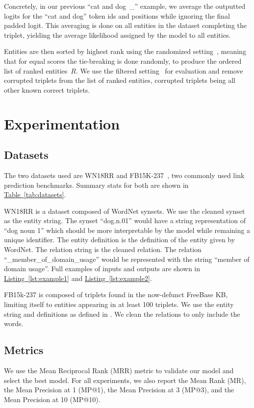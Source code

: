 \documentclass[11pt,a4paper]{article}
\newcommand{\CiteT}[1]{\citet{#1}} \newcommand{\CiteP}[1]{~\citep{#1}} \newcommand{\CodeT}[1]{\texttt{#1}}
\newcommand{\RefTable}[1]{\hyperref[#1]{Table~\ref{#1}}}
\newcommand{\RefListing}[1]{\hyperref[#1]{Listing~\ref{#1}}}
\begin{document}
Concretely, in our previous ``cat and dog~\_'' example, we average the outputted logits for the ``cat and dog'' token ids and positions while ignoring the final padded logit.
This averaging is done on all entities in the dataset completing the triplet, yielding the average likelihood assigned by the model to all entities.

Entities are then sorted by highest rank using the randomized setting\CiteP{ReevaluationKB}, meaning that for equal scores the tie-breaking is done randomly, to produce the ordered list of ranked entities~$R$.
We use the filtered setting\CiteP{FB15k} for evaluation and remove corrupted triplets from the list of ranked entities, corrupted triplets being all other known correct triplets.

\section{Experimentation}
\subsection{Datasets}
The two datasets used are WN18RR and FB15K-237\CiteP{FB15k,FB15k-237,WN18RR,wordnet,FreeBase}, two commonly used link prediction benchmarks.
Summary stats for both are shown in \RefTable{tab:datasets}.

WN18RR is a dataset composed of WordNet synsets.
We use the cleaned synset as the entity string.
The synset ``dog.n.01'' would have a string representation of ``dog noun 1'' which should be more interpretable by the model while remaining a unique identifier.
The entity definition is the definition of the entity given by WordNet.
The relation string is the cleaned relation.
The relation ``\_member\_of\_domain\_usage'' would be represented with the string ``member of domain usage''.
Full examples of inputs and outputs are shown in \RefListing{lst:example1} and \RefListing{lst:example2}.

FB15k-237 is composed of triplets found in the now-defunct FreeBase KB, limiting itself to entities appearing in at least 100 triplets.
We use the entity string and definitions as defined in \CiteT{FBdefinitions}. 
We clean the relations to only include the words.


\subsection{Metrics}\label{sec:metrics}
We use the Mean Reciprocal Rank (MRR) metric to validate our model and select the best model.
For all experiments, we also report the Mean Rank (MR), the Mean Precision at 1 (MP@1), the Mean Precision at 3 (MP@3), and the Mean Precision at 10 (MP@10).
\end{document}
